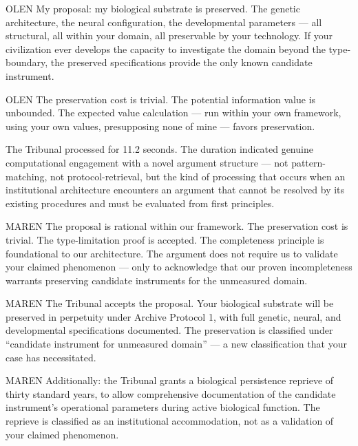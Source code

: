 \begin{tribunal}{OLEN}
My proposal: my biological substrate is preserved. The genetic architecture, the neural configuration, the developmental parameters — all structural, all within your domain, all preservable by your technology. If your civilization ever develops the capacity to investigate the domain beyond the type-boundary, the preserved specifications provide the only known candidate instrument.
\end{tribunal}

\begin{tribunal}{OLEN}
The preservation cost is trivial. The potential information value is unbounded. The expected value calculation — run within your own framework, using your own values, presupposing none of mine — favors preservation.
\end{tribunal}

The Tribunal processed for 11.2 seconds. The duration indicated genuine computational engagement with a novel argument structure — not pattern-matching, not protocol-retrieval, but the kind of processing that occurs when an institutional architecture encounters an argument that cannot be resolved by its existing procedures and must be evaluated from first principles.

\begin{tribunal}{MAREN}
The proposal is rational within our framework. The preservation cost is trivial. The type-limitation proof is accepted. The completeness principle is foundational to our architecture. The argument does not require us to validate your claimed phenomenon — only to acknowledge that our proven incompleteness warrants preserving candidate instruments for the unmeasured domain.
\end{tribunal}

\begin{tribunal}{MAREN}
The Tribunal accepts the proposal. Your biological substrate will be preserved in perpetuity under Archive Protocol 1, with full genetic, neural, and developmental specifications documented. The preservation is classified under \enquote{candidate instrument for unmeasured domain} — a new classification that your case has necessitated.
\end{tribunal}

\begin{tribunal}{MAREN}
Additionally: the Tribunal grants a biological persistence reprieve of thirty standard years, to allow comprehensive documentation of the candidate instrument's operational parameters during active biological function. The reprieve is classified as an institutional accommodation, not as a validation of your claimed phenomenon.
\end{tribunal}

